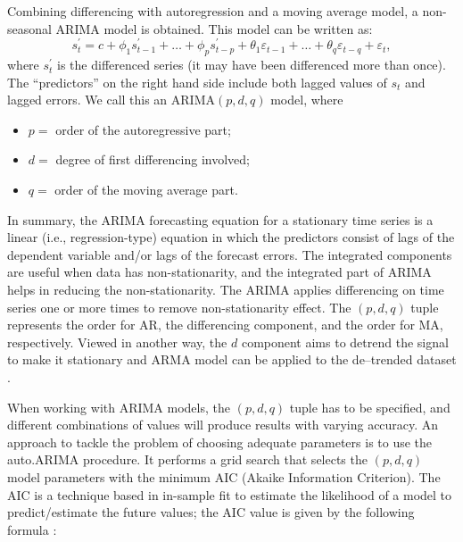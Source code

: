 Combining differencing with autoregression and a moving average model, a non-seasonal ARIMA model is obtained. This model can be written as:
\begin{equation}
    \label{Eq:ARIMApdq}
    s^{'}_{t} = c + \phi_{1} s^{'}_{t-1} + \ldots + \phi_{p} s^{'}_{t-p} + \theta_{1}\varepsilon_{t-1} + \ldots + \theta_{q} \varepsilon_{t-q} + \varepsilon_{t},
\end{equation}
where $s^{'}_{t}$ is the differenced series (it may have been differenced more than once). The ``predictors'' on the right hand side include both lagged values of $s_{t}$ and lagged errors. We call this an ARIMA$(p,d,q)$ model, where
\begin{itemize}
    \item $p =$ order of the autoregressive part;
    \item $d =$ degree of first differencing involved;
    \item $q =$ order of the moving average part. 
\end{itemize}

In summary, the ARIMA forecasting equation for a stationary time series is a linear (i.e., regression-type) equation in which the predictors consist of lags of the dependent variable and/or lags of the forecast errors.  The integrated components are useful when data has non-stationarity, and the integrated part of ARIMA helps in reducing the non-stationarity. The ARIMA applies differencing on time series one or more times to remove non-stationarity effect. The $(p, d, q)$ tuple represents the order for AR, the differencing component, and the order for MA, respectively. Viewed in another way, the $d$ component aims to detrend the signal to make it stationary and ARMA model can be applied to the de--trended dataset \cite{Hyndman2018}.

When working with ARIMA models, the $(p, d, q)$ tuple has to be specified, and different combinations of values will produce results with varying accuracy. An approach to tackle the problem of choosing adequate parameters is to use the auto.ARIMA procedure. It performs a grid search that selects the $(p, d, q)$ model parameters with the minimum AIC (Akaike Information Criterion). The AIC is a technique based in in-sample fit to estimate the likelihood of a model to predict/estimate the future values; the AIC value is given by the following formula \cite{Hyndman2008}:

